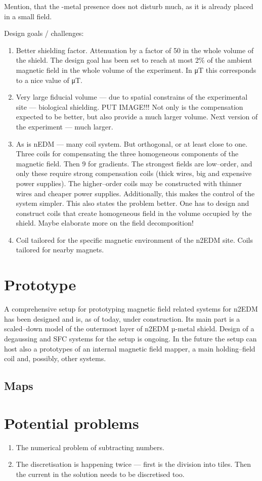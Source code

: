 Mention, that the \micro-metal presence does not disturb much, as it is already placed in a small field.


Design goals / challenges:
\begin{enumerate}
  \item Better shielding factor. Attenuation by a factor of 50 in the whole volume of the shield. The design goal has been set to reach at most 2\% of the ambient magnetic field in the
  whole volume of the experiment. In \unit[50]{\micro T} this corresponds to a nice value of \unit[1]{\micro T}.
  \item Very large fiducial volume --- due to spatial constrains of the experimental site --- biological shielding. PUT IMAGE!!! Not only is the compensation expected to be better, but also provide a much larger volume. Next version of the experiment --- much larger.
  \item As is nEDM --- many coil system. But orthogonal, or at least close to one. Three coils for compensating the three homogeneous components of the magnetic field. Then 9 for gradients. The strongest fields are low--order, and only these require strong compensation coils (thick wires, big and expensive power supplies). The higher--order coils may be constructed with thinner wires and cheaper power supplies.
  Additionally, this makes the control of the system simpler.
  This also states the problem better. One has to design and construct coils that create homogeneous field in the volume occupied by the shield. Maybe elaborate more on the field decomposition!
  \item Coil tailored for the specific magnetic environment of the n2EDM site. Coils tailored for nearby magnets.
\end{enumerate}


\section{Prototype}
A comprehensive setup for prototyping magnetic field related systems for n2EDM has been designed and is, as of today, under construction. Its main part is a scaled--down model of the outermost layer of n2EDM µ-metal shield. Design of a degaussing and SFC systems for the setup is ongoing. In the future the setup can host also a prototypes of an internal magnetic field mapper, a main holding--field coil and, possibly, other systems.

\subsection{Maps}

\section{Potential problems}
\begin{enumerate}
  \item The numerical problem of subtracting numbers.
  \item The discretisation is happening twice --- first is the division into tiles. Then the current in the solution needs to be discretised too.
\end{enumerate}
